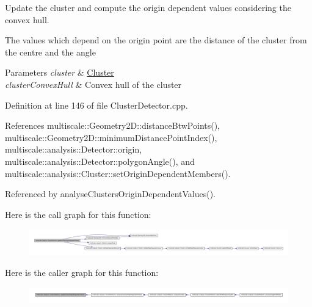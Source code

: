 \-Update the cluster and compute the origin dependent values considering the convex hull. 

\-The values which depend on the origin point are the distance of the cluster from the centre and the angle


\begin{DoxyParams}{\-Parameters}
{\em cluster} & \hyperlink{classmultiscale_1_1analysis_1_1Cluster}{\-Cluster} \\
\hline
{\em cluster\-Convex\-Hull} & \-Convex hull of the cluster \\
\hline
\end{DoxyParams}


\-Definition at line 146 of file \-Cluster\-Detector.\-cpp.



\-References multiscale\-::\-Geometry2\-D\-::distance\-Btw\-Points(), multiscale\-::\-Geometry2\-D\-::minimum\-Distance\-Point\-Index(), multiscale\-::analysis\-::\-Detector\-::origin, multiscale\-::analysis\-::\-Detector\-::polygon\-Angle(), and multiscale\-::analysis\-::\-Cluster\-::set\-Origin\-Dependent\-Members().



\-Referenced by analyse\-Clusters\-Origin\-Dependent\-Values().



\-Here is the call graph for this function\-:
\nopagebreak
\begin{figure}[H]
\begin{center}
\leavevmode
\includegraphics[width=350pt]{classmultiscale_1_1analysis_1_1ClusterDetector_ac7e008a7674205095f94b91c8d7cdccc_cgraph}
\end{center}
\end{figure}




\-Here is the caller graph for this function\-:
\nopagebreak
\begin{figure}[H]
\begin{center}
\leavevmode
\includegraphics[width=350pt]{classmultiscale_1_1analysis_1_1ClusterDetector_ac7e008a7674205095f94b91c8d7cdccc_icgraph}
\end{center}
\end{figure}




